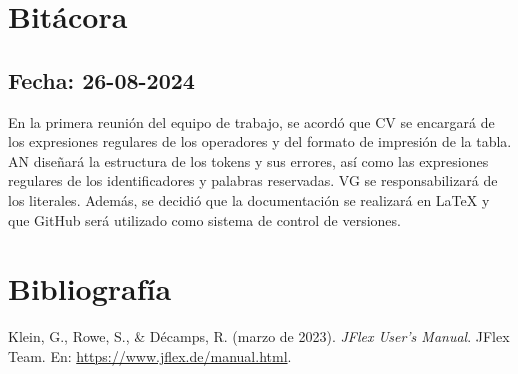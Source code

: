 \documentclass[a4paper,12pt]{article}
\begin{document}
\section*{Bitácora}

\subsection*{Fecha: 26-08-2024}
\begin{flushleft}
    \hspace*{2em} En la primera reunión del equipo de trabajo,
    se acordó que CV se encargará de los expresiones regulares
    de los operadores y del formato de impresión de la tabla.
    AN diseñará la estructura de los tokens y sus errores, 
    así como las expresiones regulares de los identificadores
    y palabras reservadas. VG se responsabilizará de los 
    literales. Además, se decidió que la documentación se 
    realizará en LaTeX y que GitHub será utilizado como 
    sistema de control de versiones.
\end{flushleft}

\newpage
\section*{Bibliografía}
\begin{thebibliography}{9}

Klein, G., Rowe, S., \& Décamps, R. (marzo de 2023).
\emph{JFlex User’s Manual}.
JFlex Team.
En: \url{https://www.jflex.de/manual.html}.

\end{thebibliography}
\end{document}
